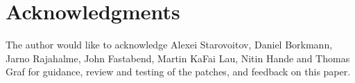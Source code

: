 \documentclass[10pt,sigconf,authorversion]{lpc}
\newcommand\todo[1]{\textcolor{red}{#1}}
\begin{document}

\section{Acknowledgments}

The author would like to acknowledge Alexei Starovoitov, Daniel Borkmann, Jarno
Rajahalme, John Fastabend, Martin KaFai Lau, Nitin Hande and Thomas Graf for
guidance, review and testing of the patches, and feedback on this paper.



\end{document}
